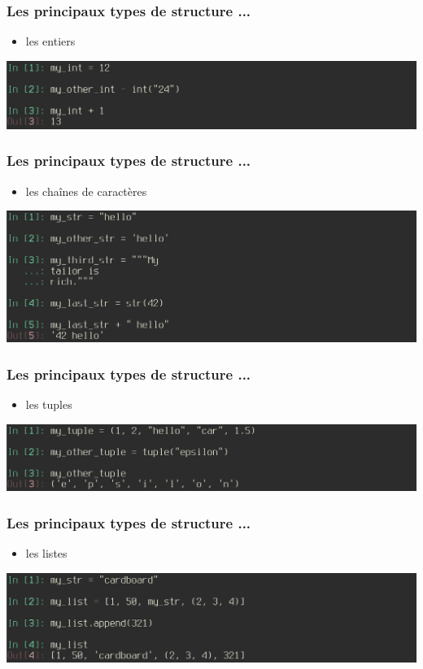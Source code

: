 \begin{frame}
  \frametitle{Les principaux types de structure ...}
    \begin{itemize}
      \item les entiers
    \end{itemize}
    \includegraphics[scale=0.35]{type_int.png}
\end{frame}

\begin{frame}
  \frametitle{Les principaux types de structure ...}
    \begin{itemize}
      \item les chaînes de caractères
    \end{itemize}
    \includegraphics[scale=0.35]{type_str.png}
\end{frame}

\begin{frame}
  \frametitle{Les principaux types de structure ...}
    \begin{itemize}
      \item les tuples
    \end{itemize}
    \includegraphics[scale=0.35]{type_tuple.png}
\end{frame}

\begin{frame}
  \frametitle{Les principaux types de structure ...}
    \begin{itemize}
      \item les listes
    \end{itemize}
    \includegraphics[scale=0.35]{type_list.png}
\end{frame}

